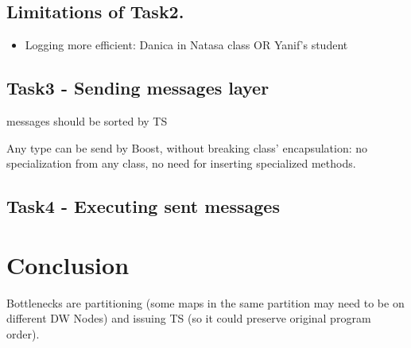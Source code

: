 \documentclass{sig-semester}
\begin{document}
\subsection{Limitations of Task2. }
\begin{itemize}
 \item Logging more efficient: Danica in Natasa class OR Yanif's student 
\end{itemize}

\subsection{Task3 - Sending messages layer }
messages should be sorted by TS

Any type can be send by Boost, without breaking class' encapsulation: no specialization from any class, no need for inserting specialized methods.

\subsection {Task4 - Executing sent messages }

\section{Conclusion}
\vspace{2mm}
Bottlenecks are partitioning (some maps in the same partition may need to be on different DW Nodes) and issuing TS (so it could preserve original program order).

%
%

\newpage
\end{document}
